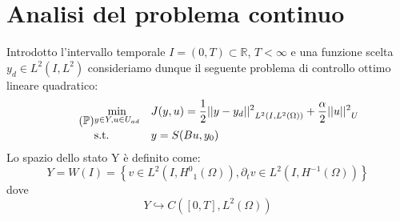\chapter{Analisi del problema continuo}
\label{chap:Continuos}

Introdotto l'intervallo temporale $I = (0,T) \subset \mathbb{R}$, $T < \infty$ e una funzione scelta $y_d \in L^2(I,L^2)$ consideriamo dunque il seguente problema di controllo ottimo lineare quadratico:
{\renewcommand\arraystretch{2}
\begin{equation}
\tag{$\mathbb{P}$}
\begin{aligned}
& \underset{y \in Y, u \in U_{ad}}{\text{min}}
& & J(y,u) = \frac{1}{2}{||y-y_d||^{2}}_{L^2(I,L^2(\Omega))} + \frac{\alpha}{2}{||u||^{2}}_U \\
& \text{s.t.} & &  y = S(Bu,y_0) \\
\label{eq:200}
\end{aligned}
\end{equation}
} %
Lo spazio dello stato Y è definito come:
\begin{equation}
Y = W(I) =  \left\{ v \in L^2(I, {H^0}_1(\Omega)), {{\partial}_{t}}v \in L^2(I, H^{-1}(\Omega)) \right\}
\label{eq:201}
\end{equation}
dove
\begin{equation}
Y \hookrightarrow C(\left[0,T\right], L^2(\Omega))
\label{eq:202}
\end{equation}